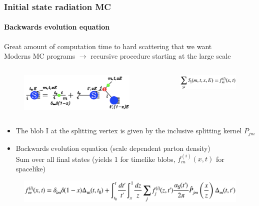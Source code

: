\documentclass[aspectratio=43]{beamer}
\begin{document}
\begin{frame}

	\frametitle{Initial state radiation MC}
	\framesubtitle{Backwards evolution equation}

	\footnotesize Great amount of computation time to hard scattering that we want \\
	\footnotesize Moderns MC programs $\rightarrow$ recursive procedure starting at the large scale \\
	
	\begin{columns}
		
		
		\begin{figure}
			\includegraphics[width = 6 cm]{plots/ISR_backwards.png}
		\end{figure}
		
		
		\begin{figure}
			\includegraphics[width = 3.5 cm]{plots/ISR_backwards_eq1.png}
		\end{figure}
		
	\end{columns}
	
	\vspace{0.5cm}
	
	\begin{itemize}
		\item \footnotesize The {\color{red}blob I} at the splitting vertex is given by the inclusive splitting kernel $P_{jm}$ \\
		\item \footnotesize Backwards evolution equation (scale dependent parton density) \\
		Sum over all final states (yields 1 for timelike blobs, $f^{(i)}_{m}(x, t)$ for spacelike)
	\end{itemize}

	\begin{figure}
		\includegraphics[width = 10 cm]{plots/ISR_backwards_eq2.png}
	\end{figure}

\end{frame}
\end{document}
